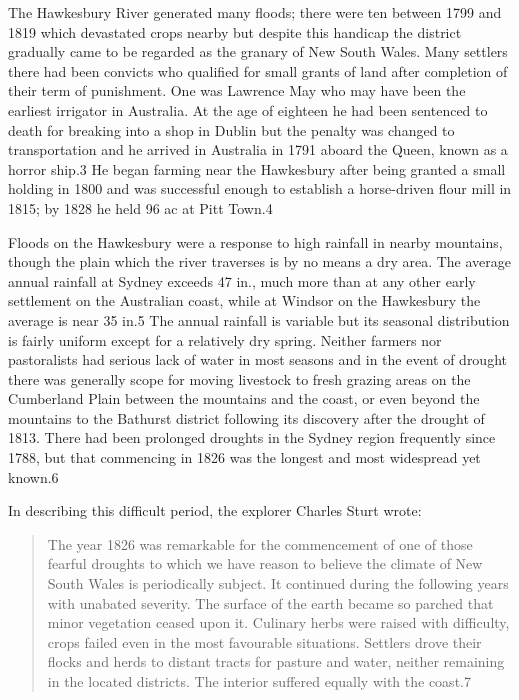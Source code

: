 The Hawkesbury River generated many floods; there were ten between
1799 and 1819 which devastated crops nearby but despite this handicap
the district gradually came to be regarded as the granary of New South
Wales. Many settlers there had been convicts who qualified for small
grants of land after completion of their term of punishment. One was
Lawrence May who may have been the earliest irrigator in Australia. At
the age of eighteen he had been sentenced to death for breaking into a
shop in Dublin but the penalty was changed to transportation and he
arrived in Australia in 1791 aboard the Queen, known as a horror
ship.3 He began farming near the Hawkesbury after being granted a
small holding in 1800 and was successful enough to establish a
horse-driven flour mill in 1815; by 1828 he held 96 ac at Pitt Town.4

Floods on the Hawkesbury were a response to high rainfall in nearby
mountains, though the plain which the river traverses is by no means a
dry area. The average annual rainfall at Sydney exceeds 47 in., much
more than at any other early settlement on the Australian coast, while
at Windsor on the Hawkesbury the average is near 35 in.5 The annual
rainfall is variable but its seasonal distribution is fairly uniform
except for a relatively dry spring. Neither farmers nor pastoralists
had serious lack of water in most seasons and in the event of drought
there was generally scope for moving livestock to fresh grazing areas
on the Cumberland Plain between the mountains and the coast, or even
beyond the mountains to the Bathurst district following its discovery
after the drought of 1813. There had been prolonged droughts in the
Sydney region frequently since 1788, but that commencing in 1826 was
the longest and most widespread yet known.6

In describing this difficult period, the explorer Charles Sturt wrote:
\begin{quote}
	The year 1826 was remarkable for the commencement of one of
	those fearful droughts to which we have reason to believe the
	climate of New South Wales is periodically subject. It
	continued during the following years with unabated
	severity. The surface of the earth became so parched that
	minor vegetation ceased upon it. Culinary herbs were raised
	with difficulty, crops failed even in the most favourable
	situations. Settlers drove their flocks and herds to distant
	tracts for pasture and water, neither remaining in the located
	districts. The interior suffered equally with the coast.7
\end{quote}


